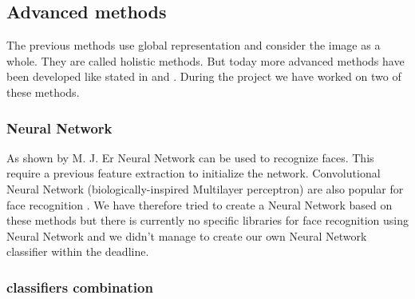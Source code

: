 \subsection{Advanced methods}

The previous methods use global representation and consider the image as a whole. They are called holistic methods. But today more advanced methods 
have been developed like stated in \cite{literature_review} and \cite{FR_survey}.
During the project we have worked on two of these methods.
\subsubsection{Neural Network}
As shown by M. J. Er \cite{RBF_NN} Neural Network can be used to recognize faces. This require a previous feature extraction to initialize the 
network. Convolutional Neural Network (biologically-inspired Multilayer perceptron) are also popular for face recognition \cite{CNN}. We have 
therefore tried to create a Neural Network based on these methods but there is currently no specific libraries for face recognition using Neural 
Network and we didn't manage to create our own Neural Network classifier within the deadline.

\subsubsection{classifiers combination}
